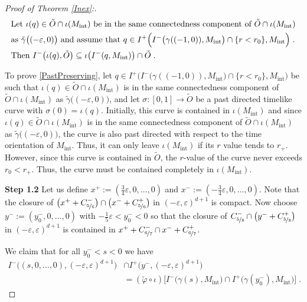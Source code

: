 \documentclass[reqno]{article}
\newcommand{\ed}{(-\varepsilon, \varepsilon)^{d+1}}
\newcommand{\Mint}{M_{\mathrm{int}}}
\begin{document}
\begin{proof}[Proof of Theorem \ref{Inex}:]
\begin{equation}
\label{PastPreserving}
\begin{split}
&\textnormal{Let } \iota(q) \in \tilde{O} \cap \iota(\Mint) \textnormal{ be in the same connectedness component of } \tilde{O} \cap \iota(\Mint) \\ &\textnormal{as }  \tilde{\gamma}\big((-\varepsilon, 0)\big) \textnormal{ and assume that } q \in I^+ \Big( I^-\big(\gamma((-1,0)), \Mint\big) \cap \{r < r_0\}, \Mint\Big) \;. \\ &\textnormal{Then } I^-\big(\iota(q),\tilde{O}\big) \subseteq \iota\big(I^-(q,\Mint) \big) \cap  \tilde{O} \;.
\end{split}
\end{equation}
\begin{center}
\def\svgwidth{8cm}

\end{center}
To prove \eqref{PastPreserving}, let $q \in I^+ \Big( I^-\big(\gamma((-1,0)), \Mint\big) \cap \{r < r_0\}, \Mint\Big)$ be such that $\iota(q) \in \tilde{O} \cap \iota(\Mint)$ is in the same connectedness component of $\tilde{O} \cap \iota(\Mint)$ as $\tilde{\gamma}\big((-\varepsilon, 0)\big)$, and let $\sigma : [0,1] \to \tilde{O}$ be a past directed timelike curve with $\sigma(0) = \iota(q)$. Initially, this curve is contained in $\iota(\Mint)$ and since $\iota(q) \in \tilde{O} \cap \iota(\Mint)$ is in the same connectedness component of $\tilde{O} \cap \iota(\Mint)$ as $\tilde{\gamma}\big((-\varepsilon, 0)\big)$, the curve is also past directed with respect to the time orientation of $\Mint$. Thus, it can only leave $\iota(\Mint)$ if its $r$ value tends to $r_+$. However, since this curve is contained in $\tilde{O}$, the $r$-value of the curve never exceeds $r_0 < r_+$. Thus, the curve must be contained completely in $\iota(\Mint)$.
\vspace*{2mm}

\textbf{Step 1.2}
Let us define $x^+ :=(\frac{3}{4} \varepsilon, 0, \ldots, 0)$ and $x^- :=(-\frac{3}{4} \varepsilon, 0, \ldots, 0)$. Note that the closure of $\big(x^+ + C^-_{\nicefrac{5}{6}}\big) \cap \big(x^- + C^+_{\nicefrac{5}{6}}\big)$ in $\ed$ is compact.
Now choose $y^- := (y^-_0, 0, \ldots, 0)$ with $ - \frac{1}{5}\varepsilon < y^-_0 < 0$ so that the closure of $C^-_{\nicefrac{5}{8}} \cap \big(y^- + C^+_{\nicefrac{5}{8}} \big)$ in $(-\varepsilon, \varepsilon)^{d+1}$ is contained in  $x^+ + C^-_{\nicefrac{6}{7}} \cap x^- + C^+_{\nicefrac{6}{7}}$.
\begin{center}
\def\svgwidth{8.5cm}

\end{center}
We claim that for all $y^-_0 < s < 0$ we have 
\begin{equation}
\label{FuturePastPreserving}
\begin{split}
I^-\big((s,0, \ldots, 0), \ed\big) &\cap I^+\big(y^-, \ed\big)  \\
&= (\tilde{\varphi} \circ \iota) \Big[I^-\big(\gamma(s), \Mint \big) \cap I^+\big( \gamma(y^-_0), \Mint\big) \Big] \;.
\end{split}
\end{equation}


\end{proof}
\end{document}
